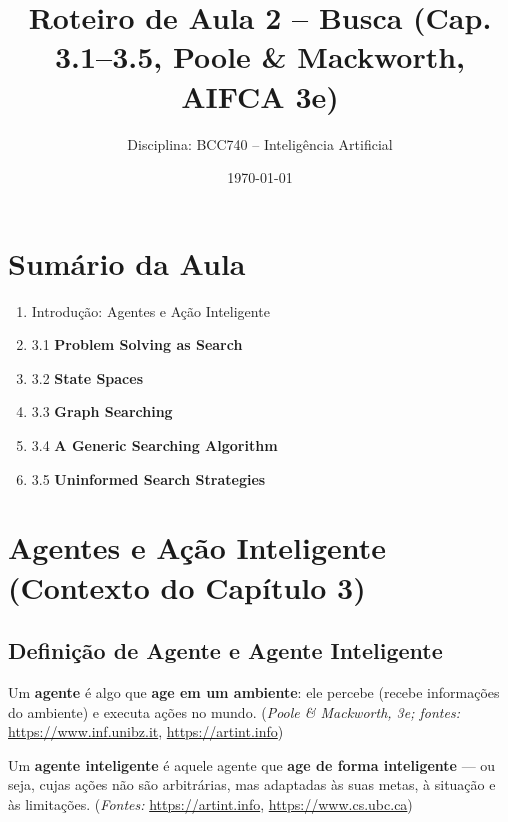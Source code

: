 \documentclass[9pt,a4paper]{extarticle}
\begin{document}
\title{Roteiro de Aula 2 -- Busca (Cap. 3.1--3.5, Poole \& Mackworth, AIFCA 3e)}
\author{Disciplina: BCC740 -- Inteligência Artificial}
\date{\today}
\maketitle

\section*{Sumário da Aula}
\begin{enumerate}
  \item Introdução: Agentes e Ação Inteligente
  \item 3.1 \textbf{Problem Solving as Search}
  \item 3.2 \textbf{State Spaces}
  \item 3.3 \textbf{Graph Searching}
  \item 3.4 \textbf{A Generic Searching Algorithm}
  \item 3.5 \textbf{Uninformed Search Strategies}
\end{enumerate}

\section{Agentes e Ação Inteligente (Contexto do Capítulo 3)}

\subsection*{Definição de Agente e Agente Inteligente}

Um \textbf{agente} é algo que \textbf{age em um ambiente}: ele percebe (recebe informações do ambiente) e executa ações no mundo.  
(\textit{Poole \& Mackworth, 3e; fontes:} \url{https://www.inf.unibz.it}, \url{https://artint.info})

\medskip
Um \textbf{agente inteligente} é aquele agente que \textbf{age de forma inteligente} — ou seja, cujas ações não são arbitrárias, mas adaptadas às suas metas, à situação e às limitações.  
(\textit{Fontes:} \url{https://artint.info}, \url{https://www.cs.ubc.ca})
\end{document}
